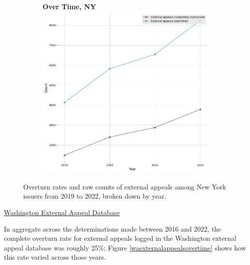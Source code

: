 \documentclass[12pt, a4paper,twoside,parskip=full]{report}
\theoremstyle{plain} %
\theoremstyle{definition} %
\theoremstyle{remark} %
\numberwithin{equation}{chapter}
\begin{document}
\begin{figure}[h!]
\begin{subfigure}[b]{0.49\textwidth}
				\textbf{Over Time, NY}\\
				\includegraphics[width=\textwidth]{images/nys_external/external_appeals_by_year.png}
			\end{subfigure}
			\caption{Overturn rates and raw counts of external appeals among New York issuers from 2019 to 2022, broken down by year.}
			\label{nyexternalappealsovertime}
		\end{figure}
		\clearpage
	
		\underline{Washington External Appeal Database}

		In aggregate across the determinations made between 2016 and 2022, the complete overturn rate for external appeals logged in the Washington external appeal database was roughly 25\%; Figure \ref{waexternalappealsovertime} shows how this rate varied across those years.
		
\end{document}
